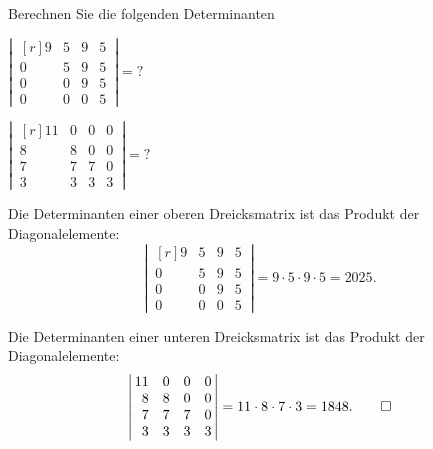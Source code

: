 Berechnen Sie die folgenden Determinanten
\begin{teilaufgaben}
\item
$
\left|\,\begin{matrix*}[r]
9&5&9&5\\
0&5&9&5\\
0&0&9&5\\
0&0&0&5
\end{matrix*}\,\right|
=
\text{?}
$
\item
$
\left|\,\begin{matrix*}[r]
11&0&0&0\\
 8&8&0&0\\
 7&7&7&0\\
 3&3&3&3
\end{matrix*}\,\right|
=
\text{?}
$
\end{teilaufgaben}

\begin{loesung}
\begin{teilaufgaben}
\item
Die Determinanten einer oberen Dreicksmatrix ist das Produkt der 
Diagonalelemente:
\[
\left|\,\begin{matrix*}[r]
9&5&9&5\\
0&5&9&5\\
0&0&9&5\\
0&0&0&5
\end{matrix*}\,\right|
=
9\cdot 5\cdot 9 \cdot 5 
=
2025.
\]
\item
Die Determinanten einer unteren Dreicksmatrix ist das Produkt der 
Diagonalelemente:
\[
\left|\,\begin{matrix*}[r]
11&0&0&0\\
 8&8&0&0\\
 7&7&7&0\\
 3&3&3&3
\end{matrix*}\,\right|
=
11\cdot 8 \cdot 7 \cdot 3 = 1848.
\qedhere
\]
\end{teilaufgaben}
\end{loesung}


